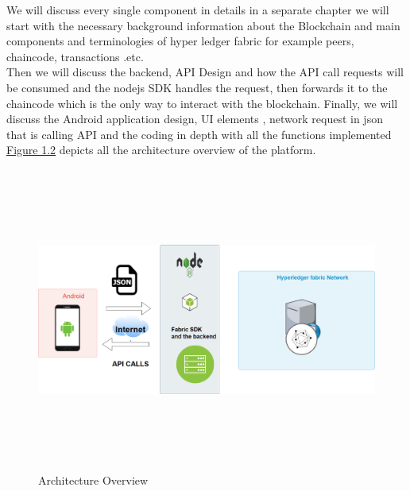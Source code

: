 We will discuss every single component in details in a separate chapter we will start with the necessary background information about the Blockchain and main components and terminologies of hyper ledger fabric for example peers, chaincode, transactions .etc. \\ Then we will discuss the backend, API Design  and how the API call requests will be consumed and the nodejs SDK handles the request, then forwards it to the chaincode which is the only way to interact with the blockchain.
Finally, we will discuss the Android application design, UI elements , network request in json that is calling API and the coding in depth with all the functions implemented \hyperref[fig:architecture]{Figure 1.2} depicts all the architecture overview of the platform. 
\begin{figure}[H]
	\includegraphics[width=15cm,height=10cm]{images/architecture.png}
	\caption{Architecture Overview}
	\label{fig:architecture}
	\end{figure}

      

 


      